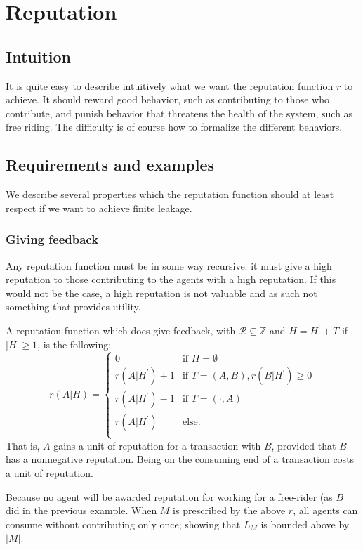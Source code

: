 \chapter{Reputation}\label{chapter:reputation}
\section{Intuition}
It is quite easy to describe intuitively what we want the reputation function $r$ to achieve. 
It should reward good behavior, 
such as contributing to those who contribute, 
and punish behavior that threatens the health of the system, 
such as free riding. 
The difficulty is of course how to formalize the different behaviors.

\section{Requirements and examples}\label{section:requirements_reputation}
We describe several properties which the reputation function should at least respect if we want to achieve finite leakage.

\subsection{Giving feedback}
Any reputation function must be in some way recursive: it must give a high reputation to those contributing to the agents with a high reputation. If this would not be the case, a high reputation is not valuable and as such not something that provides utility.

A reputation function which does give feedback, with $\mathcal{R} \subseteq \mathds{Z}$ and $H = H^\prime + T$ if $|H| \geq 1$, is the following:
\[ r(A|H) = \begin{cases}
0 & \text{if } H = \emptyset\\
r(A|H^\prime) + 1 & \text{if } T = (A, B), r(B|H^\prime) \geq 0\\
r(A|H^\prime) - 1 & \text{if } T = (\cdot, A)\\
r(A|H^\prime) & \text{else}.\\ 
\end{cases} \]
That is, $A$ gains a unit of reputation for a transaction with $B$, provided that $B$ has a nonnegative reputation. Being on the consuming end of a transaction costs a unit of reputation.

Because no agent will be awarded reputation for working for a free-rider (as $B$ did in the previous example. When $M$ is prescribed by the above $r$, all agents can consume without contributing only once; showing that $L_M$ is bounded above by $|M|$.

